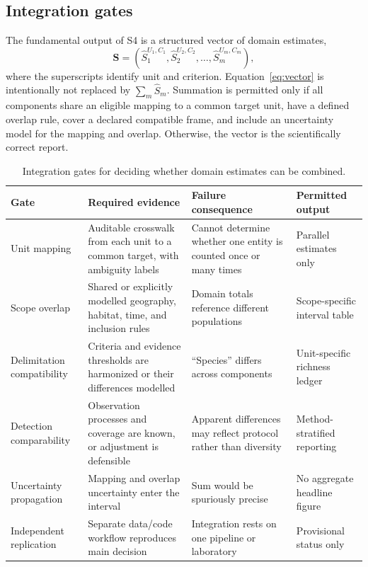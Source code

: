 \documentclass[conference]{IEEEtran}
\begin{document}
\subsection{Integration gates}

The fundamental output of S4 is a structured vector of domain estimates,
\begin{equation}
\mathbf{S}=\left(\widehat{S}_{1}^{U_1,C_1},\widehat{S}_{2}^{U_2,C_2},\ldots,\widehat{S}_{m}^{U_m,C_m}\right),
\label{eq:vector}
\end{equation}
where the superscripts identify unit and criterion. Equation~\eqref{eq:vector} is intentionally not replaced by $\sum_m \widehat{S}_m$. Summation is permitted only if all components share an eligible mapping to a common target unit, have a defined overlap rule, cover a declared compatible frame, and include an uncertainty model for the mapping and overlap. Otherwise, the vector is the scientifically correct report.

\begin{table}[t]
\caption{Integration gates for deciding whether domain estimates can be combined.}
\label{tab:gates}
\centering
\footnotesize
\begin{tabular}{L{0.20\textwidth} L{0.31\textwidth} L{0.22\textwidth} L{0.19\textwidth}}
\toprule
\textbf{Gate} & \textbf{Required evidence} & \textbf{Failure consequence} & \textbf{Permitted output}\\
\midrule
Unit mapping & Auditable crosswalk from each unit to a common target, with ambiguity labels & Cannot determine whether one entity is counted once or many times & Parallel estimates only\\
Scope overlap & Shared or explicitly modelled geography, habitat, time, and inclusion rules & Domain totals reference different populations & Scope-specific interval table\\
Delimitation compatibility & Criteria and evidence thresholds are harmonized or their differences modelled & ``Species'' differs across components & Unit-specific richness ledger\\
Detection comparability & Observation processes and coverage are known, or adjustment is defensible & Apparent differences may reflect protocol rather than diversity & Method-stratified reporting\\
Uncertainty propagation & Mapping and overlap uncertainty enter the interval & Sum would be spuriously precise & No aggregate headline figure\\
Independent replication & Separate data/code workflow reproduces main decision & Integration rests on one pipeline or laboratory & Provisional status only\\
\bottomrule
\end{tabular}
\end{table}
\end{document}
